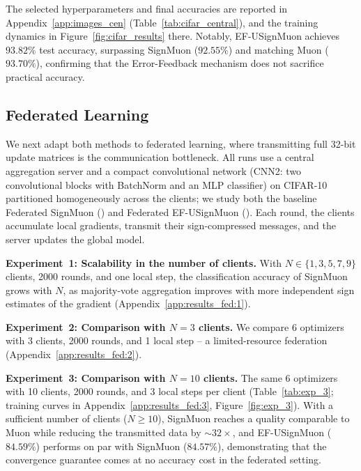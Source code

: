 \documentclass{article}
\begin{document}
The selected hyperparameters and final accuracies are reported in Appendix~\ref{app:images_cen} (Table~\ref{tab:cifar_central}), and the training dynamics in Figure~\ref{fig:cifar_results} there. Notably, EF-USignMuon achieves $93.82\%$ test accuracy, surpassing SignMuon ($92.55\%$) and matching Muon ($93.70\%$), confirming that the Error-Feedback mechanism does not sacrifice practical accuracy.

\subsection{Federated Learning}
We next adapt both methods to federated learning, where transmitting full 32-bit update matrices is the communication bottleneck. All runs use a central aggregation server and a compact convolutional network (CNN2: two convolutional blocks with BatchNorm and an MLP classifier) on CIFAR-10 partitioned homogeneously across the clients; we study both the baseline Federated SignMuon () and Federated EF-USignMuon (). Each round, the clients accumulate local gradients, transmit their sign-compressed messages, and the server updates the global model.

\textbf{Experiment~1: Scalability in the number of clients.} With $N \in \{1, 3, 5, 7, 9\}$ clients, 2000 rounds, and one local step, the classification accuracy of SignMuon grows with $N$, as majority-vote aggregation improves with more independent sign estimates of the gradient (Appendix~\ref{app:results_fed:1}).

\textbf{Experiment~2: Comparison with $N=3$ clients.} We compare 6 optimizers with 3 clients, 2000 rounds, and 1 local step -- a limited-resource federation (Appendix~\ref{app:results_fed:2}).

\textbf{Experiment~3: Comparison with $N=10$ clients.} The same 6 optimizers with 10 clients, 2000 rounds, and 3 local steps per client (Table~\ref{tab:exp_3}; training curves in Appendix~\ref{app:results_fed:3}, Figure~\ref{fig:exp_3}). With a sufficient number of clients ($N \ge 10$), SignMuon reaches a quality comparable to Muon while reducing the transmitted data by ${\sim}32\times$, and EF-USignMuon ($84.59\%$) performs on par with SignMuon ($84.57\%$), demonstrating that the convergence guarantee comes at no accuracy cost in the federated setting.
\end{document}
